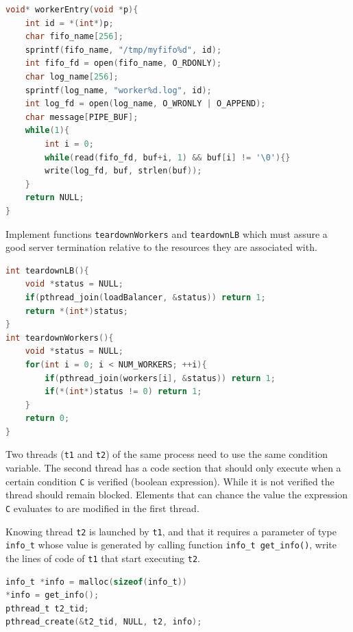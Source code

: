 \documentclass{sope}
\begin{document}
\ansseparator

\begin{lstlisting}[language=C]
void* workerEntry(void *p){
    int id = *(int*)p;
    char fifo_name[256];
    sprintf(fifo_name, "/tmp/myfifo%d", id);
    int fifo_fd = open(fifo_name, O_RDONLY);
    char log_name[256];
    sprintf(log_name, "worker%d.log", id);
    int log_fd = open(log_name, O_WRONLY | O_APPEND);
    char message[PIPE_BUF];
    while(1){
        int i = 0;
        while(read(fifo_fd, buf+i, 1) && buf[i] != '\0'){}
        write(log_fd, buf, strlen(buf));
    }
    return NULL;
}
\end{lstlisting}

Implement functions \texttt{teardownWorkers} and \texttt{teardownLB} which must assure a good server termination relative to the resources they are associated with.

\ansseparator

\begin{lstlisting}[language=C]
int teardownLB(){
    void *status = NULL;
    if(pthread_join(loadBalancer, &status)) return 1;
    return *(int*)status;
}
int teardownWorkers(){
    void *status = NULL;
    for(int i = 0; i < NUM_WORKERS; ++i){
        if(pthread_join(workers[i], &status)) return 1;
        if(*(int*)status != 0) return 1;
    }
    return 0;
}
\end{lstlisting}

\newpage
{}
Two threads (\texttt{t1} and \texttt{t2}) of the same process need to use the same condition variable. The second thread has a code section that should only execute when a certain condition \texttt{C} is verified (boolean expression). While it is not verified the thread should remain blocked. Elements that can chance the value the expression \texttt{C} evaluates to are modified in the first thread.

Knowing thread \texttt{t2} is launched by \texttt{t1}, and that it requires a parameter of type \texttt{info\_t} whose value is generated by calling function \texttt{info\_t get\_info()}, write the lines of code of \texttt{t1} that start executing \texttt{t2}.

\ansseparator

\begin{lstlisting}[language=C]
info_t *info = malloc(sizeof(info_t))
*info = get_info();
pthread_t t2_tid;
pthread_create(&t2_tid, NULL, t2, info);
\end{lstlisting}
\end{document}

